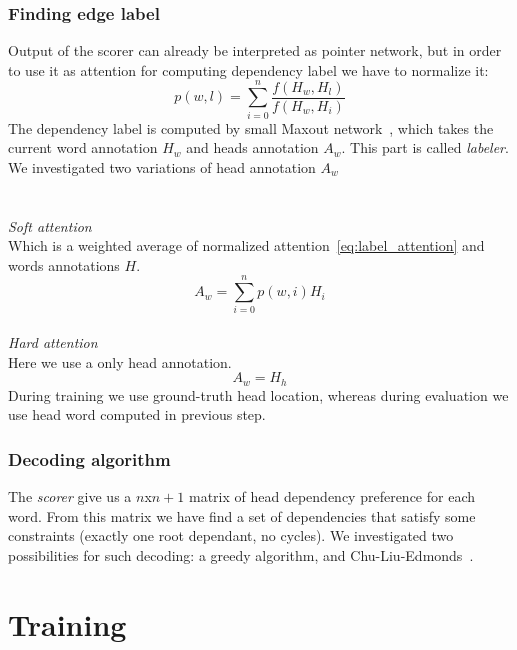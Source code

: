 \subsubsection{Finding edge label}
Output of the scorer can already be interpreted as
pointer network, but in order to use it as attention for computing dependency label
we have to normalize it:
\begin{equation} \label{eq:label_attention}
    p(w,l) = \sum_{i=0}^{n} \frac{f(H_w, H_l)}{f(H_w, H_i)}
\end{equation}
The dependency label is computed by small Maxout network~\cite{goodfellow_maxout_2013},
which takes the current word annotation $H_w$ and heads annotation $A_w$. This
part is called \emph{labeler}.
We investigated two variations of head annotation $A_w$
\\
\\
\\
\emph{Soft attention}\\
Which is a weighted average of normalized attention~\ref{eq:label_attention}
and words annotations $H$. 
$$ A_w = \sum_{i=0}^{n} p(w,i)H_i $$
\\
\emph{Hard attention}\\
Here we use a only head annotation.
$$ A_w = H_h $$
During training we use ground-truth head location, whereas during evaluation
we use head word computed in previous step.

\subsubsection{Decoding algorithm}
The \emph{scorer} give us a $n$x$n+1$ matrix of head dependency preference
for each word. From this matrix we have find a set of dependencies that satisfy
some constraints (exactly one root dependant, no cycles).
We investigated two possibilities for such decoding: a greedy algorithm, and
Chu-Liu-Edmonds~\cite{edmonds_optimim_1966}.

\section{Training}
